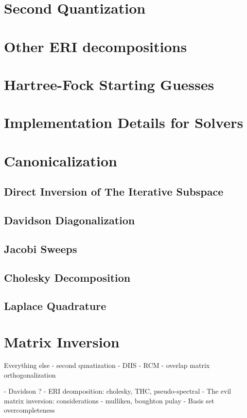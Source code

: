 \appendix
\chapter{Second Quantization}

\chapter{Other ERI decompositions \label{app:ERIDECOMP}}

\chapter{Hartree-Fock Starting Guesses \label{app:SCFGUESS}}

\chapter{Implementation Details for Solvers}

\chapter{Canonicalization \label{app:CANON}}

\section{Direct Inversion of The Iterative Subspace \label{sec:DIIS}}

\section{Davidson Diagonalization \label{sec:DAV}}

\section{Jacobi Sweeps \label{sec:LOCORB}}

\section{Cholesky Decomposition \label{sec:CHOLDEC}}

\section{Laplace Quadrature \label{sec:LAPLACE}}

\chapter{Matrix Inversion \label{app:MATINV}}

Everything else
- second qunatization
- DIIS 
- RCM
- overlap matrix orthogonalization

- Davidson ? 
- ERI deomposition: cholesky, THC, pseudo-spectral
- The evil matrix inversion: considerations
- mulliken, boughton pulay
- Basis set overcompleteness